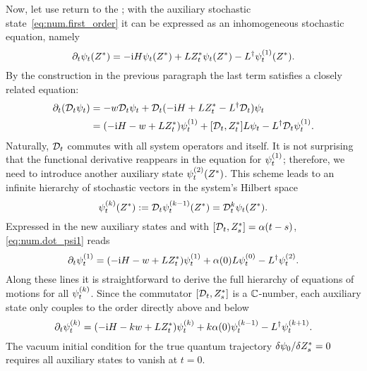 Now, let use return to the \NMSSE; with the auxiliary stochastic state~\ref{eq:num.first_order} it can be expressed as an inhomogeneous stochastic equation, namely
\begin{equation*}
  \partial_t \psitZ = -\ii\Hsys\psitZ + L\ZZ_t\psitZ - \adj{L}\psitZ[1].
\end{equation*}
By the construction in the previous paragraph the last term satisfies a closely related equation:
\begin{align}
  \partial_t (\adjZZ_t \psi_t) &= - w \adjZZ_t\psi_t + \adjZZ_t ( -\ii\Hsys + L\ZZ_t - \adj{L} \adjZZ_t ) \psi_t \nonumber \\
  &= (-\ii\Hsys - w + L\ZZ_t) \psit[1] + [\adjZZ_t, \ZZ_t] L\psit - \adj{L} \adjZZ_t \psit[1].
  \label{eq:num.dot_psi1}
\end{align}
Naturally, $\mathcal{D}_t$ commutes with all system operators and itself.
It is not surprising that the functional derivative reappears in the equation for $\psit[1]$; therefore, we need to introduce another auxiliary state $\psitZ[2]$.
This scheme leads to an infinite hierarchy of stochastic vectors in the system's Hilbert space
\begin{equation}
  \psitZ[k] := \adjZZ_t \psitZ[k-1] = \adjZZ_t^k \psitZ.
  \label{eq:num.auxiliary_states}
\end{equation}
Expressed in the new auxiliary states and with $[\mathcal{D}_t, {Z}^*_s] = \alpha(t-s)$, \autoref{eq:num.dot_psi1} reads
\begin{equation*}
  \partial_t \psit[1] = (-\ii\Hsys - w + L\ZZ_t) \psit[1] + \alpha(0) L\psit[0] - \adj{L}\psit[2].
\end{equation*}
Along these lines it is straightforward to derive the full hierarchy of equations of motions for all $\psit[k]$.
Since the commutator $[\mathcal{D}_t, {Z}^*_s]$ is a $\mathbb{C}$-number, each auxiliary state only couples to the order directly above and below
\begin{equation}
  \partial_t\psit[k] = (-\ii\Hsys - kw + L\ZZ_t)\psit[k] + k \alpha(0) \psit[k-1] - \adj{L} \psit[k+1].
  \label{eq:num.hierarchy_lin}
\end{equation}
The vacuum initial condition for the true quantum trajectory $\delta \psi_0 / \delta {Z}^*_s = 0$ requires all auxiliary states to vanish at $t=0$.


